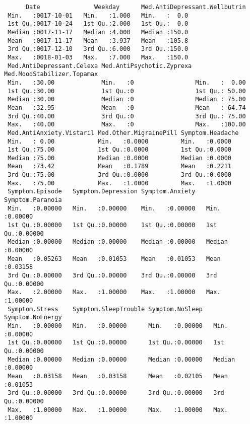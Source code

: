 \documentclass[11pt]{article}
\begin{document}
    
    \begin{verbatim}
      Date               Weekday      Med.AntiDepressant.Wellbutrin
 Min.   :0017-10-01   Min.   :1.000   Min.   :  0.0                
 1st Qu.:0017-10-24   1st Qu.:2.000   1st Qu.:  0.0                
 Median :0017-11-17   Median :4.000   Median :150.0                
 Mean   :0017-11-17   Mean   :3.937   Mean   :105.8                
 3rd Qu.:0017-12-10   3rd Qu.:6.000   3rd Qu.:150.0                
 Max.   :0018-01-03   Max.   :7.000   Max.   :150.0                
 Med.AntiDepressant.Celexa Med.AntiPsychotic.Zyprexa Med.MoodStabilizer.Topamax
 Min.   :30.00             Min.   :0                 Min.   :  0.00            
 1st Qu.:30.00             1st Qu.:0                 1st Qu.: 50.00            
 Median :30.00             Median :0                 Median : 75.00            
 Mean   :32.95             Mean   :0                 Mean   : 64.74            
 3rd Qu.:40.00             3rd Qu.:0                 3rd Qu.: 75.00            
 Max.   :40.00             Max.   :0                 Max.   :100.00            
 Med.AntiAnxiety.Vistaril Med.Other.MigrainePill Symptom.Headache
 Min.   : 0.00            Min.   :0.0000         Min.   :0.0000  
 1st Qu.:75.00            1st Qu.:0.0000         1st Qu.:0.0000  
 Median :75.00            Median :0.0000         Median :0.0000  
 Mean   :73.42            Mean   :0.1789         Mean   :0.2211  
 3rd Qu.:75.00            3rd Qu.:0.0000         3rd Qu.:0.0000  
 Max.   :75.00            Max.   :1.0000         Max.   :1.0000  
 Symptom.Episode   Symptom.Depression Symptom.Anxiety   Symptom.Paranoia 
 Min.   :0.00000   Min.   :0.00000    Min.   :0.00000   Min.   :0.00000  
 1st Qu.:0.00000   1st Qu.:0.00000    1st Qu.:0.00000   1st Qu.:0.00000  
 Median :0.00000   Median :0.00000    Median :0.00000   Median :0.00000  
 Mean   :0.05263   Mean   :0.01053    Mean   :0.01053   Mean   :0.03158  
 3rd Qu.:0.00000   3rd Qu.:0.00000    3rd Qu.:0.00000   3rd Qu.:0.00000  
 Max.   :2.00000   Max.   :1.00000    Max.   :1.00000   Max.   :1.00000  
 Symptom.Stress    Symptom.SleepTrouble Symptom.NoSleep   Symptom.NoEnergy 
 Min.   :0.00000   Min.   :0.00000      Min.   :0.00000   Min.   :0.00000  
 1st Qu.:0.00000   1st Qu.:0.00000      1st Qu.:0.00000   1st Qu.:0.00000  
 Median :0.00000   Median :0.00000      Median :0.00000   Median :0.00000  
 Mean   :0.03158   Mean   :0.03158      Mean   :0.02105   Mean   :0.01053  
 3rd Qu.:0.00000   3rd Qu.:0.00000      3rd Qu.:0.00000   3rd Qu.:0.00000  
 Max.   :1.00000   Max.   :1.00000      Max.   :1.00000   Max.   :1.00000  

\end{verbatim}
\end{document}
